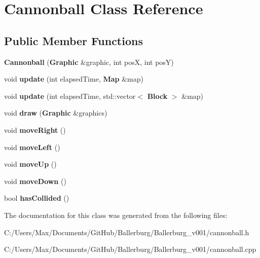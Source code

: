 \section{Cannonball Class Reference}
\label{class_cannonball}
\subsection*{Public Member Functions}
\begin{DoxyCompactItemize}
\item 
{\bfseries Cannonball} ({\bf Graphic} \&graphic, int pos\+X, int pos\+Y)\label{class_cannonball_ae7e8fe5eb3272229d78c221ac4b56a55}

\item 
void {\bfseries update} (int elapsed\+Time, {\bf Map} \&map)\label{class_cannonball_a8bd123a497feecb18da788ec6d724158}

\item 
void {\bfseries update} (int elapsed\+Time, std\+::vector$<$ {\bf Block} $>$ \&map)\label{class_cannonball_a4e9110f4da8a085d2654aa1ed4f2dcb6}

\item 
void {\bfseries draw} ({\bf Graphic} \&graphics)\label{class_cannonball_aa8cb4cb637acbf6b6132f34b0588fd46}

\item 
void {\bfseries move\+Right} ()\label{class_cannonball_ade6097b63fc6d66c14014843a5e84c2e}

\item 
void {\bfseries move\+Left} ()\label{class_cannonball_a00f73b76d893d76a48cf74d3d123c874}

\item 
void {\bfseries move\+Up} ()\label{class_cannonball_af8bcca2d4dd7a84d52bd2d89203ce9cd}

\item 
void {\bfseries move\+Down} ()\label{class_cannonball_af69eb8fff953a77721d63063d82b2650}

\item 
bool {\bfseries has\+Collided} ()\label{class_cannonball_a3c2e8ae577405cd797f7e5bfbeab2e59}

\end{DoxyCompactItemize}


The documentation for this class was generated from the following files\+:\begin{DoxyCompactItemize}
\item 
C\+:/\+Users/\+Max/\+Documents/\+Git\+Hub/\+Ballerburg/\+Ballerburg\+\_\+v001/cannonball.\+h\item 
C\+:/\+Users/\+Max/\+Documents/\+Git\+Hub/\+Ballerburg/\+Ballerburg\+\_\+v001/cannonball.\+cpp\end{DoxyCompactItemize}
